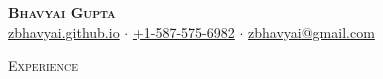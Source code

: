 \documentclass[a4paper]{article}
\newcommand{\lineunder} {
    \vspace*{-8pt} \\
    \hspace*{-18pt} \hrulefill \\
}
\newcommand{\header} [1] {
    {\hspace*{-18pt}\vspace*{6pt} \textsc{#1}}
    \vspace*{-6pt} \lineunder
}
\begin{document}
\vspace*{-40pt}


\vspace*{-10pt}
\begin{center}
    \textbf{\Huge \scshape {Bhavyai Gupta}}\\
    \href{https://zbhavyai.github.io}{zbhavyai.github.io} $\cdot$ \href{tel:+15875756982}{+1-587-575-6982} $\cdot$ \href{mailto:zbhavyai@gmail.com}{zbhavyai@gmail.com} \\
\end{center}


\header{Experience}
\vspace{1mm}
\end{document}

